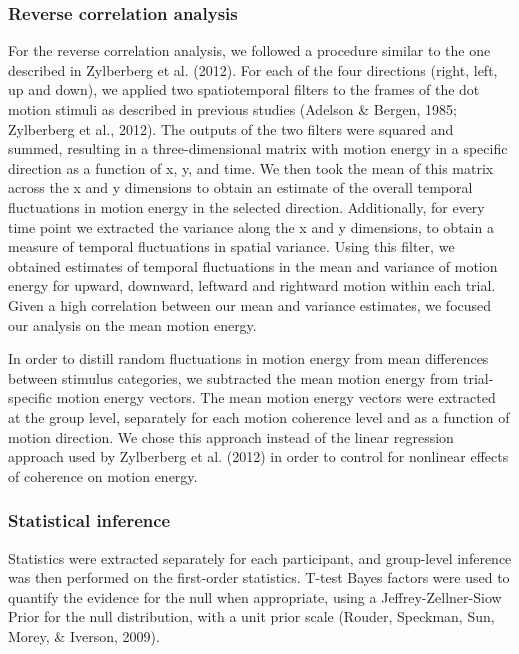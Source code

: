 \documentclass[12pt,twoside]{reedthesis}
\begin{document}
\hypertarget{reverse-correlation-analysis}{%
\subsubsection*{Reverse correlation analysis}\label{reverse-correlation-analysis}}

For the reverse correlation analysis, we followed a procedure similar to the one described in Zylberberg et al. (2012). For each of the four directions (right, left, up and down), we applied two spatiotemporal filters to the frames of the dot motion stimuli as described in previous studies (Adelson \& Bergen, 1985; Zylberberg et al., 2012). The outputs of the two filters were squared and summed, resulting in a three-dimensional matrix with motion energy in a specific direction as a function of x, y, and time. We then took the mean of this matrix across the x and y dimensions to obtain an estimate of the overall temporal fluctuations in motion energy in the selected direction. Additionally, for every time point we extracted the variance along the x and y dimensions, to obtain a measure of temporal fluctuations in spatial variance. Using this filter, we obtained estimates of temporal fluctuations in the mean and variance of motion energy for upward, downward, leftward and rightward motion within each trial. Given a high correlation between our mean and variance estimates, we focused our analysis on the mean motion energy.

In order to distill random fluctuations in motion energy from mean differences between stimulus categories, we subtracted the mean motion energy from trial-specific motion energy vectors. The mean motion energy vectors were extracted at the group level, separately for each motion coherence level and as a function of motion direction. We chose this approach instead of the linear regression approach used by Zylberberg et al. (2012) in order to control for nonlinear effects of coherence on motion energy.

\hypertarget{statistical-inference}{%
\subsubsection*{Statistical inference}\label{statistical-inference}}

Statistics were extracted separately for each participant, and group-level inference was then performed on the first-order statistics. T-test Bayes factors were used to quantify the evidence for the null when appropriate, using a Jeffrey-Zellner-Siow Prior for the null distribution, with a unit prior scale (Rouder, Speckman, Sun, Morey, \& Iverson, 2009).
\end{document}
